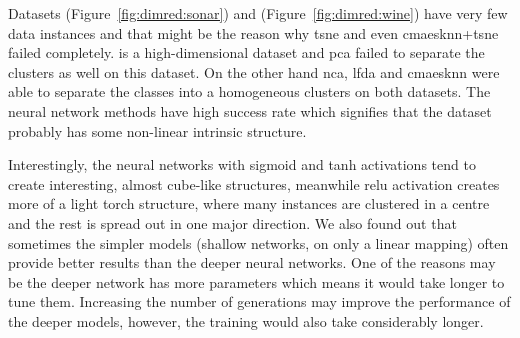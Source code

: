 \documentclass[12pt,a4paper]{report}
\begin{document}
Datasets  (Figure~\ref{fig:dimred:sonar}) and  (Figure~\ref{fig:dimred:wine}) have very few data instances and that might be the reason why \ac{tsne} and even \ac{cmaesknn}+\ac{tsne} failed completely.  is a high-dimensional dataset and \ac{pca} failed to separate the clusters as well on this dataset. On the other hand \ac{nca}, \ac{lfda} and \ac{cmaesknn} were able to separate the classes into a homogeneous clusters on both datasets. The neural network methods have high success rate which signifies that the dataset probably has some non-linear intrinsic structure.

Interestingly, the neural networks with sigmoid and \ac{tanh} activations tend to create interesting, almost cube-like structures, meanwhile \ac{relu} activation creates more of a light torch structure, where many instances are clustered in a centre and the rest is spread out in one major direction. We also found out that sometimes the simpler models (shallow networks, on only a linear mapping) often provide better results than the deeper neural networks. One of the reasons may be the deeper network has more parameters which means it would take longer to tune them. Increasing the number of generations may improve the performance of the deeper models, however, the training would also take considerably longer.

\end{document}

